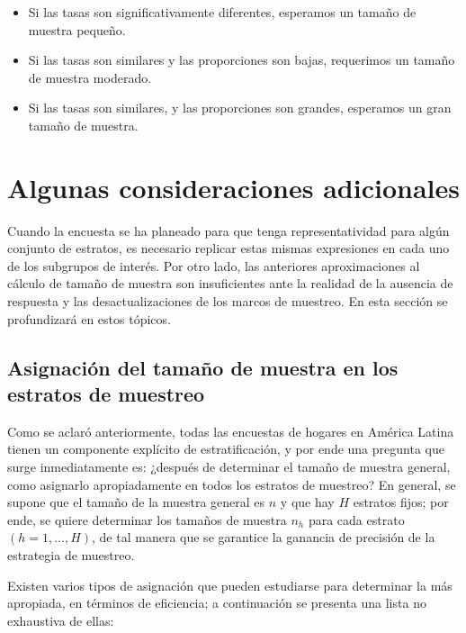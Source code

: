 \documentclass[
  12pt,
  spanish,
]{book}
\providecommand{\tightlist}{%
  \setlength{\itemsep}{0pt}\setlength{\parskip}{0pt}}
\begin{document}
\begin{itemize}
\tightlist
\item
  Si las tasas son significativamente diferentes, esperamos un tamaño de muestra pequeño.
\item
  Si las tasas son similares y las proporciones son bajas, requerimos un tamaño de muestra moderado.
\item
  Si las tasas son similares, y las proporciones son grandes, esperamos un gran tamaño de muestra.
\end{itemize}

\hypertarget{algunas-consideraciones-adicionales}{%
\section{Algunas consideraciones adicionales}\label{algunas-consideraciones-adicionales}}

Cuando la encuesta se ha planeado para que tenga representatividad para algún conjunto de estratos, es necesario replicar estas mismas expresiones en cada uno de los subgrupos de interés. Por otro lado, las anteriores aproximaciones al cálculo de tamaño de muestra son insuficientes ante la realidad de la ausencia de respuesta y las desactualizaciones de los marcos de muestreo. En esta sección se profundizará en estos tópicos.

\hypertarget{asignaciuxf3n-del-tamauxf1o-de-muestra-en-los-estratos-de-muestreo}{%
\subsection{Asignación del tamaño de muestra en los estratos de muestreo}\label{asignaciuxf3n-del-tamauxf1o-de-muestra-en-los-estratos-de-muestreo}}

Como se aclaró anteriormente, todas las encuestas de hogares en América Latina tienen un componente explícito de estratificación, y por ende una pregunta que surge inmediatamente es: ¿después de determinar el tamaño de muestra general, como asignarlo apropiadamente en todos los estratos de muestreo? En general, se supone que el tamaño de la muestra general es \(n\) y que hay \(H\) estratos fijos; por ende, se quiere determinar los tamaños de muestra \(n_h\) para cada estrato \((h = 1, \ldots, H)\), de tal manera que se garantice la ganancia de precisión de la estrategia de muestreo.

Existen varios tipos de asignación que pueden estudiarse para determinar la más apropiada, en términos de eficiencia; a continuación se presenta una lista no exhaustiva de ellas:
\end{document}
